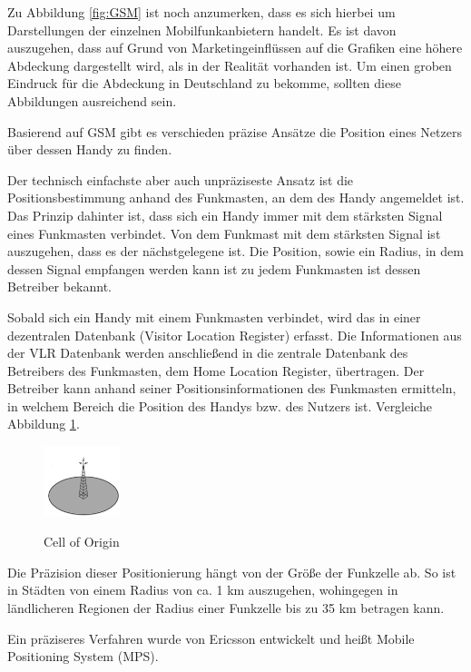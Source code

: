 Zu Abbildung \ref{fig:GSM} ist noch anzumerken, dass es sich hierbei um Darstellungen der einzelnen Mobilfunkanbietern handelt. Es ist davon auszugehen, dass auf Grund von Marketingeinflüssen auf die Grafiken eine höhere Abdeckung dargestellt wird, als in der Realität vorhanden ist. Um einen groben Eindruck für die Abdeckung in Deutschland zu bekomme, sollten diese Abbildungen ausreichend sein.


Basierend auf GSM gibt es verschieden präzise Ansätze die Position eines Netzers über dessen Handy zu finden.


Der technisch einfachste aber auch unpräziseste Ansatz ist die Positionsbestimmung anhand des Funkmasten, an dem des Handy angemeldet ist. Das Prinzip dahinter ist, dass sich ein Handy immer mit dem stärksten Signal eines Funkmasten verbindet. Von dem Funkmast mit dem stärksten Signal ist auszugehen, dass es der nächstgelegene ist. Die Position, sowie ein Radius, in dem dessen Signal empfangen werden kann ist zu jedem Funkmasten ist dessen Betreiber bekannt. 

Sobald sich ein Handy mit einem Funkmasten verbindet, wird das in einer dezentralen Datenbank (Visitor Location Register) erfasst. Die Informationen aus der VLR Datenbank werden anschließend in die zentrale Datenbank des Betreibers des Funkmasten, dem Home Location Register, übertragen. Der Betreiber kann anhand seiner Positionsinformationen des Funkmasten ermitteln, in welchem Bereich die Position des Handys bzw. des Nutzers ist. Vergleiche Abbildung \ref{fig:CoO}.

\begin{figure}[h]
\centering
\includegraphics[width=0.2\textwidth]{ref/images/CellOfOrigin.PNG}
\caption[Cell of Origin]{Cell of Origin}
\label{fig:CoO}
\cite[S. 209]{Schiller2004}
\end{figure}

Die Präzision dieser Positionierung hängt von der Größe der Funkzelle ab. So ist in Städten von einem Radius von ca. 1 km auszugehen, wohingegen in ländlicheren Regionen der Radius einer Funkzelle bis zu 35 km betragen kann.
\cite[S. 207]{Schiller2004}


Ein präziseres Verfahren wurde von Ericsson entwickelt und heißt Mobile Positioning System (MPS).

